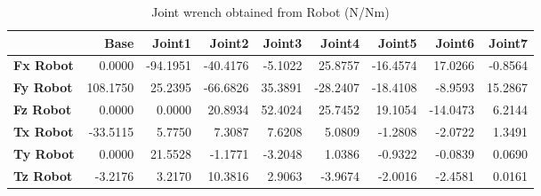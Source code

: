 \begin{table}[h!]
	\centering
	\caption{Joint wrench obtained from Robot (N/Nm)}
	\label{wrech_Robot_Pose9}
	\begin{tabular}{|l|r|r|r|r|r|r|r|r|}
		\hline
		\textbf{} & \textbf{Base} & \textbf{Joint1}  & \textbf{Joint2}  & \textbf{Joint3}  & \textbf{Joint4}  & \textbf{Joint5}  & \textbf{Joint6}  & \textbf{Joint7} \\ \hline
		\textbf{Fx Robot}  & 0.0000        & -94.1951        & -40.4176        & -5.1022        & 25.8757        & -16.4574        & 17.0266        & -0.8564 \\ \hline
		\textbf{Fy Robot}  & 108.1750        & 25.2395        & -66.6826        & 35.3891        & -28.2407        & -18.4108        & -8.9593        & 15.2867 \\ \hline
		\textbf{Fz Robot}  & 0.0000        & 0.0000        & 20.8934        & 52.4024        & 25.7452        & 19.1054        & -14.0473        & 6.2144 \\ \hline
		\textbf{Tx Robot}  & -33.5115        & 5.7750        & 7.3087        & 7.6208        & 5.0809        & -1.2808        & -2.0722        & 1.3491 \\ \hline
		\textbf{Ty Robot}  & 0.0000        & 21.5528        & -1.1771        & -3.2048        & 1.0386        & -0.9322        & -0.0839        & 0.0690 \\ \hline
		\textbf{Tz Robot}  & -3.2176        & 3.2170        & 10.3816        & 2.9063        & -3.9674        & -2.0016        & -2.4581        & 0.0161 \\ \hline
	\end{tabular}
\end{table}

